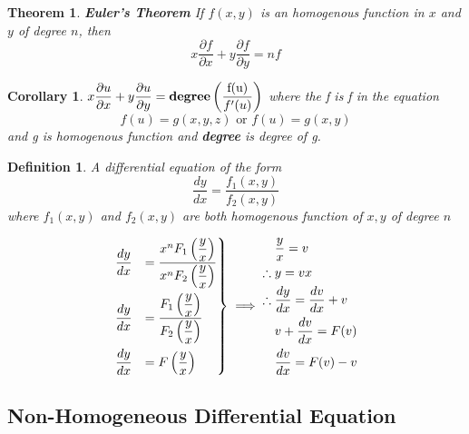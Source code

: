 \documentclass[a4paper, titlepage]{article}
\newtheorem{theorem}{Theorem}[section]
\newtheorem{definition}{Definition}[section]
\newtheorem{corollary}{Corollary}[theorem]
\begin{document}
\begin{theorem} \textup{\textbf{Euler's Theorem}} 
    If $f(x, y)$ is an homogenous function in $x$ and $y$ of degree $n$, then
    \[ x\dfrac{\partial f}{\partial x} + y\dfrac{\partial f}{\partial y} = nf \]
\end{theorem}

\begin{corollary}
    $x\dfrac{\partial u}{\partial x} + y\dfrac{\partial u}{\partial y} = \textup{\textbf{degree}} \left( \dfrac{\text{f(u)}}{f'(u)} \right)$
    where the f is f in the equation
    \[ f(u) = g(x, y, z) \text{ or } f(u) = g(x, y) \]
    and g is homogenous function and \textup{\textbf{degree}} is degree of g.
\end{corollary}

\begin{definition}
    A differential equation of the form
    \[ \dfrac{dy}{dx} = \dfrac{f_1(x, y)}{f_2(x, y)} \]
    where $f_1(x, y)$ and $f_2(x, y)$ are both homogenous function of
    $x, y$ of degree $n$
\end{definition}
    \[
        \begin{rcases}
            \dfrac{dy}{dx} &= \dfrac{x^nF_1\left( \dfrac{y}{x} \right)}{x^nF_2\left( \dfrac{y}{x} \right)} \\
            \dfrac{dy}{dx} &= \dfrac{F_1\left( \dfrac{y}{x} \right)}{F_2\left( \dfrac{y}{x} \right)} \\
            \dfrac{dy}{dx} &= F\left( \dfrac{y}{x} \right)    
        \end{rcases}
        \implies
        \begin{aligned}[c]
            & \dfrac{y}{x} = v \\
            \therefore \; & y = vx \\
            \therefore \; & \dfrac{dy}{dx} = \dfrac{dv}{dx} + v \\
            & v + \dfrac{dv}{dx} = F(v) \\
            & \dfrac{dv}{dx} = F(v) - v
        \end{aligned}
    \]
    
    \subsection{Non-Homogeneous Differential Equation}
    
\end{document}
